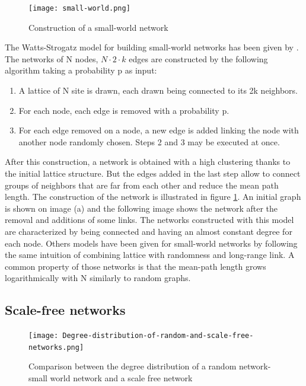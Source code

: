 \documentclass[a4paper, 12pt]{report}
\begin{document}
\begin{figure}
\centering
\texttt{[image: small-world.png]}
\caption{Construction of a small-world network \citep{small-world}}
\label{small-world_pictures}
\end{figure}


The Watts-Strogatz model for building small-world networks has been given by \cite{globalClustering1}. The networks of N nodes, $N \cdot 2 \cdot k$ edges are constructed by the following algorithm taking a probability p as input:
\begin{enumerate}
\item A lattice of N site is drawn, each drawn being connected to its 2k neighbors.
\item For each node, each edge is removed with a probability p.
\item For each edge removed on a node, a new edge is added linking the node with another node randomly chosen. Steps 2 and 3 may be executed at once.
\end{enumerate}
After this construction, a network is obtained with a high clustering thanks to the initial lattice structure. But the edges added in the last step allow to connect groups of neighbors that are far from each other and reduce the mean path length. The construction of the network is illustrated in figure \ref{small-world_pictures}. An initial graph is shown on image (a) and the following image shows the network after the removal and additions of some links. The networks constructed with this model are characterized by being connected and having an almost constant degree for each node. Others models have been given for small-world networks by following the same intuition of combining lattice with randomness and long-range link. A common property of those networks is that the mean-path length grows logarithmically with N similarly to random graphs.\citep{small-world, complex_networks}

\subsection{Scale-free networks}
\label{scale-free-section}
\begin{figure}
\centering
\texttt{[image: Degree-distribution-of-random-and-scale-free-networks.png]}
\caption{Comparison between the degree distribution of a random network- small world network and a scale free network \citep{scale-free_degree}}
\label{scale-free_degree}
\end{figure}
\end{document}
